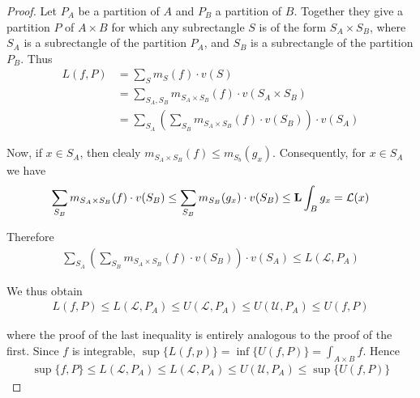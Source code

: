 \begin{proof}
    Let $P_A$ be a partition of $A$ and $P_B$ a partition of $B$.
    Together they give a partition $P$ of $A \times B$ for which any
    subrectangle $S$ is of the form $S_A \times S_B$, where $S_A$ is 
    a subrectangle of the partition $P_A$, and $S_B$ is a subrectangle of the
    partition $P_B$. Thus
    \begin{align*}
        L(f, P)
        & = \sum_{S }^{}{m_S(f)\cdot v(S)} \\
        & = \sum_{S_A, S_B}^{}{m_{S_A\times S_B}(f)\cdot v(S_A\times S_B)} \\
        & = \sum_{S_A}^{}{\left(\sum_{S_B}^{}{m_{S_A\times S_B}(f)\cdot v(S_B)}\right)\cdot v(S_A)} 
    \end{align*}

    Now, if $x\in S_A$, then clealy $m_{S_A\times S_B}(f) \le m_{S_b}(g_x)$. Consequently, for $x\in S_A$
    we have 
    \begin{align*}
        \sum_{S_B}m_{S_A\times S_B}(f)\cdot v(S_B)\leq\sum_{S_B}m_{S_B}(g_x)\cdot v(S_B)\leq\mathbf{L}\int_Bg_x=\mathcal{L}(x)
    \end{align*}

    Therefore 
    \begin{align*}
        \sum_{S_A}\left(\sum_{S_B}m_{S_A\times S_B}(f)\cdot v(S_B)\right)\cdot v(S_A)\leq L(\mathcal{L},P_A)
    \end{align*}

    We thus obtain
    \begin{align*}
        L(f,P)\leq L(\mathcal{L},P_A)\leq U(\mathcal{L},P_A)\leq U(\mathcal{U},P_A)\leq U(f,P)
    \end{align*}

    where the proof of the last inequality is entirely analogous to the proof of the first.
    Since $f$ is integrable, $\sup \{L(f, p)\}=\inf\{U(f, P)\} = \int_{A\times B} f$. Hence 
    \begin{align*}
        \sup\{f, P\} \le L(\mathcal{L},P_A)
        \le L(\mathcal{L},P_A)
        \le U(\mathcal{U},P_A)
        \le \sup\{U(f, P)\}
    \end{align*}
\end{proof}

